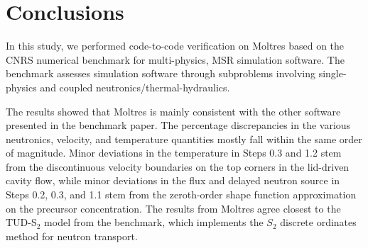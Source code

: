 \section{Conclusions}

In this study, we performed code-to-code verification on Moltres based on the
CNRS numerical benchmark \cite{tiberga_results_2020} for multi-physics,
\gls{MSR} simulation software. The benchmark assesses simulation
software through subproblems involving single-physics and coupled
neutronics/thermal-hydraulics.

The results showed that Moltres is mainly consistent with the other software
presented in the benchmark paper. The percentage discrepancies in the various
neutronics, velocity, and temperature quantities mostly fall within the same
order of magnitude. Minor deviations in the temperature in Steps 0.3 and 1.2 
stem from the discontinuous velocity
boundaries on the top corners in the lid-driven cavity flow, while minor
deviations in the flux and delayed neutron source in Steps 0.2, 0.3, and 1.1
stem from the zeroth-order shape function approximation on the precursor
concentration. The results from Moltres agree closest to the TUD-S$_2$ model
from the benchmark, which implements the $S_2$ discrete ordinates method for
neutron transport.
